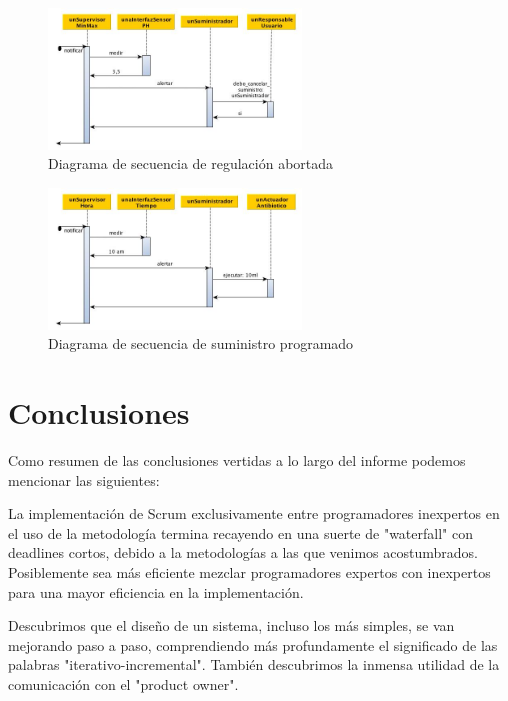 \clearpage

\begin{figure}[h!]
  \centering
  \includegraphics[width=0.6\textwidth]{./imagenes/secuencia_suministro2.jpg}
  \caption{Diagrama de secuencia de regulación abortada}
  \label{fig:sec_sum1}
\end{figure}

\begin{figure}[h!]
  \centering
  \includegraphics[width=0.6\textwidth]{./imagenes/secuencia_suministro3.jpg}
  \caption{Diagrama de secuencia de suministro programado}
  \label{fig:sec_sum1}
\end{figure}

\section{Conclusiones}
Como resumen de las conclusiones vertidas a lo largo del informe podemos mencionar las siguientes:

La implementación de Scrum exclusivamente entre programadores inexpertos en el uso de la metodología termina recayendo en una suerte de "waterfall" con deadlines cortos, debido a la metodologías a las que venimos acostumbrados. Posiblemente sea más eficiente mezclar programadores expertos con inexpertos para una mayor eficiencia en la implementación.

Descubrimos que el diseño de un sistema, incluso los más simples, se van mejorando paso a paso, comprendiendo más profundamente el significado de las palabras "iterativo-incremental". También descubrimos la inmensa utilidad de la comunicación con el "product owner".
